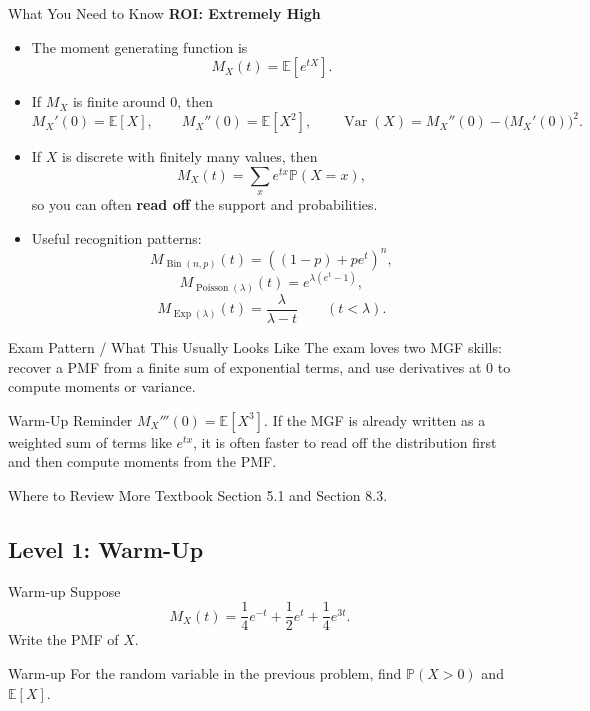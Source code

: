 \documentclass[12pt]{article}
\newcommand{\EE}{\mathbb{E}}
\newcommand{\PP}{\mathbb{P}}
\newcommand{\Var}{\operatorname{Var}}
\newcommand{\Bin}{\operatorname{Bin}}
\newcommand{\Pois}{\operatorname{Poisson}}
\newcommand{\Exp}{\operatorname{Exp}}
\newcommand{\writespace}[1]{\vspace*{#1}}
\newcommand{\medws}{\writespace{1.8cm}}
\newcommand{\roiline}[1]{\textbf{ROI: #1}}
\newcounter{problem}[section]
\begin{document}
\begin{summarybox}{What You Need to Know}
\roiline{Extremely High}
\begin{itemize}
  \item The moment generating function is
  \[
    M_X(t)=\EE[e^{tX}].
  \]
  \item If $M_X$ is finite around $0$, then
  \[
    M_X'(0)=\EE[X],\qquad M_X''(0)=\EE[X^2],\qquad \Var(X)=M_X''(0)-\bigl(M_X'(0)\bigr)^2.
  \]
  \item If $X$ is discrete with finitely many values, then
  \[
    M_X(t)=\sum_x e^{tx}\PP(X=x),
  \]
  so you can often \textbf{read off} the support and probabilities.
  \item Useful recognition patterns:
  \[
    M_{\Bin(n,p)}(t)=((1-p)+pe^t)^n,
  \]
  \[
    M_{\Pois(\lambda)}(t)=e^{\lambda(e^t-1)},
  \]
  \[
    M_{\Exp(\lambda)}(t)=\frac{\lambda}{\lambda-t}\qquad (t<\lambda).
  \]
\end{itemize}
\end{summarybox}

\begin{patternbox}{Exam Pattern / What This Usually Looks Like}
The exam loves two MGF skills: recover a PMF from a finite sum of exponential terms, and use derivatives at $0$ to compute moments or variance.
\end{patternbox}

\begin{examplebox}{Warm-Up Reminder}
$M_X'''(0)=\EE[X^3]$. If the MGF is already written as a weighted sum of terms like $e^{tx}$, it is often faster to read off the distribution first and then compute moments from the PMF.
\end{examplebox}

\begin{reviewbox}{Where to Review More}
Textbook Section 5.1 and Section 8.3.
\end{reviewbox}

\subsection*{Level 1: Warm-Up}

\begin{practiceproblem}{Warm-up}
Suppose
\[
  M_X(t)=\frac14 e^{-t}+\frac12 e^t+\frac14 e^{3t}.
\]
Write the PMF of $X$.
\end{practiceproblem}
\medws

\begin{practiceproblem}{Warm-up}
For the random variable in the previous problem, find $\PP(X>0)$ and $\EE[X]$.
\end{practiceproblem}
\medws
\end{document}
